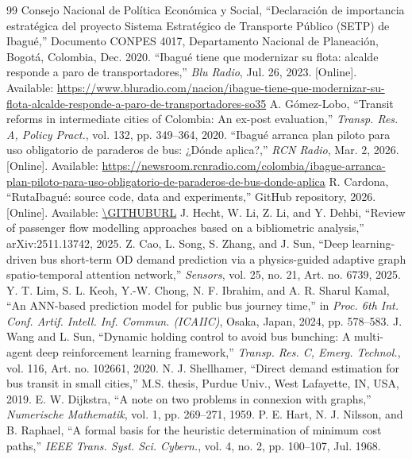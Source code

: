 \documentclass[10pt,twocolumn,letterpaper]{article}
\begin{document}
\balance
\footnotesize
\begin{thebibliography}{99}
 Consejo Nacional de Política Económica y Social, ``Declaración de importancia estratégica del proyecto Sistema Estratégico de Transporte Público (SETP) de Ibagué,'' Documento CONPES 4017, Departamento Nacional de Planeación, Bogotá, Colombia, Dec. 2020.
 ``Ibagué tiene que modernizar su flota: alcalde responde a paro de transportadores,'' \emph{Blu Radio}, Jul. 26, 2023. [Online]. Available: \url{https://www.bluradio.com/nacion/ibague-tiene-que-modernizar-su-flota-alcalde-responde-a-paro-de-transportadores-so35}
 A. Gómez-Lobo, ``Transit reforms in intermediate cities of Colombia: An ex-post evaluation,'' \emph{Transp. Res. A, Policy Pract.}, vol. 132, pp. 349--364, 2020.
 ``Ibagué arranca plan piloto para uso obligatorio de paraderos de bus: ¿Dónde aplica?,'' \emph{RCN Radio}, Mar. 2, 2026. [Online]. Available: \url{https://newsroom.rcnradio.com/colombia/ibague-arranca-plan-piloto-para-uso-obligatorio-de-paraderos-de-bus-donde-aplica}
 R. Cardona, ``RutaIbagué: source code, data and experiments,'' GitHub repository, 2026. [Online]. Available: \url{\GITHUBURL}
 J. Hecht, W. Li, Z. Li, and Y. Dehbi, ``Review of passenger flow modelling approaches based on a bibliometric analysis,'' arXiv:2511.13742, 2025.
 Z. Cao, L. Song, S. Zhang, and J. Sun, ``Deep learning-driven bus short-term OD demand prediction via a physics-guided adaptive graph spatio-temporal attention network,'' \emph{Sensors}, vol. 25, no. 21, Art. no. 6739, 2025.
 Y. T. Lim, S. L. Keoh, Y.-W. Chong, N. F. Ibrahim, and A. R. Sharul Kamal, ``An ANN-based prediction model for public bus journey time,'' in \emph{Proc. 6th Int. Conf. Artif. Intell. Inf. Commun. (ICAIIC)}, Osaka, Japan, 2024, pp. 578--583.
 J. Wang and L. Sun, ``Dynamic holding control to avoid bus bunching: A multi-agent deep reinforcement learning framework,'' \emph{Transp. Res. C, Emerg. Technol.}, vol. 116, Art. no. 102661, 2020.
 N. J. Shellhamer, ``Direct demand estimation for bus transit in small cities,'' M.S. thesis, Purdue Univ., West Lafayette, IN, USA, 2019.
 E. W. Dijkstra, ``A note on two problems in connexion with graphs,'' \emph{Numerische Mathematik}, vol. 1, pp. 269--271, 1959.
 P. E. Hart, N. J. Nilsson, and B. Raphael, ``A formal basis for the heuristic determination of minimum cost paths,'' \emph{IEEE Trans. Syst. Sci. Cybern.}, vol. 4, no. 2, pp. 100--107, Jul. 1968.

\end{thebibliography}
\end{document}
